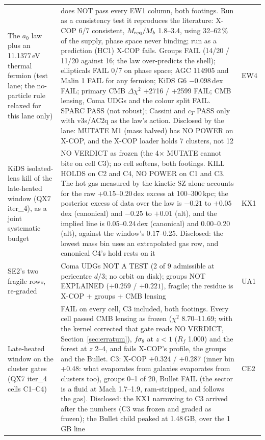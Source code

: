 \documentclass[10pt]{article}
\begin{document}
\begin{longtable}{@{}p{4.4cm}p{8.6cm}p{2.8cm}@{}}
The $a_0$ law plus an 11.1377\,eV thermal fermion (test lane; the no-particle rule relaxed for this lane only) & does NOT pass every EW1 column, both footings. Run as a consistency test it reproduces the literature: X-COP 6/7 consistent, $M_{\rm req}/M_b$ 1.8--3.4, using 32--62\,\% of the supply, phase space never binding; run as a prediction (HC1) X-COP fails. Groups FAIL (14/20 / 11/20 against 16; the law over-predicts the shell); ellipticals FAIL 0/7 on phase space; AGC 114905 and Malin 1 FAIL for any fermion; KiDS G6 $-0.098$\,dex FAIL; primary CMB $\Delta\chi^2$ +2716 / +2599 FAIL; CMB lensing, Coma UDGs and the colour split FAIL. SPARC PASS (not robust); Cassini and $c_T$ PASS only with v3s/AC2q as the law's action. Disclosed by the lane: MUTATE M1 (mass halved) has NO POWER on X-COP, and the X-COP loader holds 7 clusters, not 12 & EW4\\
KiDS isolated-lens kill of the late-heated window (QX7 iter\_4), as a joint systematic budget & NO VERDICT as frozen (the 4$\times$ MUTATE cannot bite on cell C3); no cell softens, both footings. KILL HOLDS on C2 and C4, NO POWER on C1 and C3. The hot gas measured by the kinetic SZ alone accounts for the raw +0.15--0.20\,dex excess at 100--300\,kpc; the posterior excess of data over the law is $-0.21$ to $+0.05$\,dex (canonical) and $-0.25$ to $+0.01$ (alt), and the implied line is 0.05--0.24\,dex (canonical) and 0.00--0.20 (alt), against the window's 0.17--0.25. Disclosed: the lowest mass bin uses an extrapolated gas row, and canonical C4's hold rests on it & KX1\\
SE2's two fragile rows, re-graded & Coma UDGs NOT A TEST (2 of 9 admissible at pericentre $d/3$; no orbit on disk); groups NOT EXPLAINED ($+0.259$ / $+0.221$), fragile; the residue is X-COP + groups + CMB lensing & UA1\\
Late-heated window on the cluster gates (QX7 iter\_4 cells C1--C4) & FAIL on every cell, C3 included, both footings. Every cell passed CMB lensing as frozen ($\chi^2$ 8.70--11.69; with the kernel corrected that gate reads NO VERDICT, Section~\ref{sec:erratum}), $f\sigma_8$ at $z<1$ ($R_f$ 1.000) and the forest at $z$ 2--4, and fails X-COP's profile, the groups and the Bullet. C3: X-COP +0.324 / +0.287 (inner bin +0.48: what evaporates from galaxies evaporates from clusters too), groups 0--1 of 20, Bullet FAIL (the sector is a fluid at Mach 1.7--1.9, ram-stripped, and follows the gas). Disclosed: the KX1 narrowing to C3 arrived after the numbers (C3 was frozen and graded as frozen); the Bullet child peaked at 1.48\,GB, over the 1\,GB line & CE2\\

\end{longtable}
\end{document}

